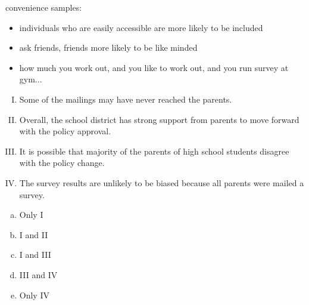 \documentclass[11pt,containsverbatim,handout,xcolor=xelatex,dvipsnames,table]{beamer}
\newcommand{\solnMult}[1]{#1}
\begin{document}
\begin{frame}
{convenience samples:
\begin{itemize}

\item individuals who are easily accessible are more likely to be included

\item ask friends, friends more likely to be like minded

\item how much you work out, and you like to work out, and you run survey at gym...

\end{itemize}

}

\end{frame}


\begin{frame}[shrink]

{\small
{}

\begin{enumerate}[I.]
\item Some of the mailings may have never reached the parents.
\item Overall, the school district has strong support from parents to move forward with 
the policy approval.
\item It is possible that majority of the parents of high school students disagree with 
the policy change.
\item The survey results are unlikely to be biased because all parents were mailed a 
survey. 
\end{enumerate}

\begin{multicols}{5}
\begin{enumerate}[(a)]
\item Only I
\item I and II
\item \solnMult{I and III}
\item III and IV
\item Only IV
\end{enumerate}
\end{multicols}
}

\end{frame}
\end{document}
